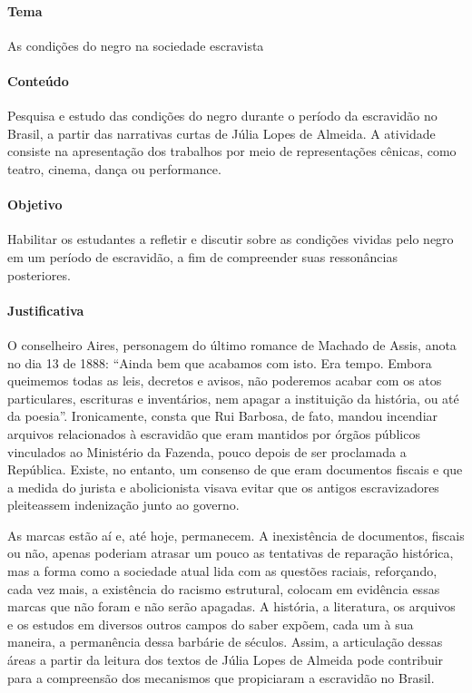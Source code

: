 \documentclass[12pt]{extarticle}
\begin{document}

\paragraph{Tema} As condições do negro na sociedade escravista

\paragraph{Conteúdo} Pesquisa e estudo das condições do negro durante o
período da escravidão no Brasil, a partir das narrativas curtas de Júlia
Lopes de Almeida. A atividade consiste na apresentação dos trabalhos por
meio de representações cênicas, como teatro, cinema, dança ou
performance.

\paragraph{Objetivo} Habilitar os estudantes a refletir e discutir sobre
as condições vividas pelo negro em um período de escravidão, a fim de
compreender suas ressonâncias posteriores.

\paragraph{Justificativa} O conselheiro Aires, personagem do último
romance de Machado de Assis, anota no dia 13 de 1888: ``Ainda bem que
acabamos com isto. Era tempo. Embora queimemos todas as leis, decretos e
avisos, não poderemos acabar com os atos particulares, escrituras e
inventários, nem apagar a instituição da história, ou até da poesia''.
Ironicamente, consta que Rui Barbosa, de fato, mandou incendiar arquivos
relacionados à escravidão que eram mantidos por órgãos públicos
vinculados ao Ministério da Fazenda, pouco depois de ser proclamada a
República. Existe, no entanto, um consenso de que eram documentos
fiscais e que a medida do jurista e abolicionista visava evitar que os
antigos escravizadores pleiteassem indenização junto ao governo.

As marcas estão aí e, até hoje, permanecem. A inexistência de documentos,
fiscais ou não, apenas poderiam atrasar um pouco as tentativas de
reparação histórica, mas a forma como a sociedade atual lida com as
questões raciais, reforçando, cada vez mais, a existência do racismo
estrutural, colocam em evidência essas marcas que não foram e não serão
apagadas. A história, a literatura, os arquivos e os estudos em diversos
outros campos do saber expõem, cada um à sua maneira, a permanência
dessa barbárie de séculos. Assim, a articulação dessas áreas a partir da
leitura dos textos de Júlia Lopes de Almeida pode contribuir para a
compreensão dos mecanismos que propiciaram a escravidão no Brasil.
\end{document}
